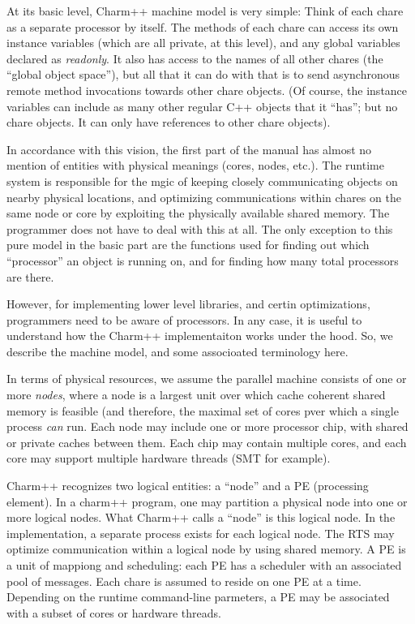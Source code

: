 
At its basic level, Charm++ machine model is very simple: Think of
each chare as a separate processor by itself. The methods of each
chare can access its own instance variables (which are all private, at
this level), and any global variables declared as {\em readonly}. It
also has access to the names of all other chares (the ``global object
space''), but all that it can do with that is to send asynchronous
remote method invocations towards other chare objects. (Of course, the
instance variables can include as many other regular C++ objects that
it ``has''; but no chare objects. It can only have references to other
chare objects).


In accordance with this vision, the first part of the manual has
almost no mention of entities with physical meanings (cores, nodes,
etc.). The runtime system is responsible for the mgic of keeping
closely communicating objects on nearby physical locations, and
optimizing communications within chares on the same node or core by
exploiting the physically available shared memory. The programmer does
not have to deal with this at all. The only exception to this pure
model in the basic part are the functions used for finding out which
``processor'' an object is running on, and for finding how many total
processors are there.

However, for implementing lower level libraries, and certin optimizations,
programmers need to be aware of processors. In any case, it is useful
to understand how the Charm++ implementaiton works under the hood. So,
we describe the machine model, and some associoated terminology here.

In terms of physical resources, we assume the parallel machine
consists of one or more {\em nodes}, where a node is a largest unit
over which cache coherent shared memory is feasible (and therefore,
the maximal set of cores pver which a single process {\em can} run.
Each node may include one or more processor chip, with shared or
private caches between them. Each chip may contain multiple cores, and
each core may support multiple hardware threads (SMT for example).

Charm++ recognizes two logical entities: a ``node'' and a PE
(processing element).  In a charm++ program, one may partition a
physical node into one or more logical nodes. What Charm++ calls a
``node'' is this logical node. In the implementation, a separate
process exists for each logical node. The RTS may optimize
communication within a logical node by using shared memory. A PE is a
unit of mappiong and scheduling: each PE has a scheduler with an
associated pool of messages. Each chare is assumed to reside on one PE
at a time. Depending on the runtime command-line parmeters, a PE may
be associated with a subset of cores or hardware threads. 

